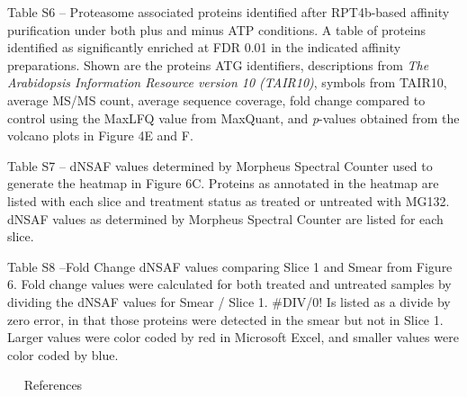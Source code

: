 Table S6 – Proteasome associated proteins identified after RPT4b-based affinity purification under both plus and minus ATP conditions. A table of proteins identified as significantly enriched at FDR 0.01 in the indicated affinity preparations.  Shown are the proteins ATG identifiers, descriptions from \textit{The Arabidopsis Information Resource version 10 (TAIR10)}, symbols from TAIR10, average MS/MS count, average sequence coverage, fold change compared to control using the MaxLFQ value from MaxQuant, and \textit{p}-values obtained from the volcano plots in Figure 4E and F.

Table S7 – dNSAF values determined by Morpheus Spectral Counter used to generate the heatmap in Figure 6C. Proteins as annotated in the heatmap are listed with each slice and treatment status as treated or untreated with MG132. dNSAF values as determined by Morpheus Spectral Counter \citep{gemperline16} are listed for each slice.

Table S8 –Fold Change dNSAF values comparing Slice 1 and Smear from Figure 6. Fold change values were calculated for both treated and untreated samples by dividing the dNSAF values for Smear / Slice 1. \#DIV/0! Is listed as a divide by zero error, in that those proteins were detected in the smear but not in Slice 1. Larger values were color coded by red in Microsoft Excel, and smaller values were color coded by blue.


 
References
